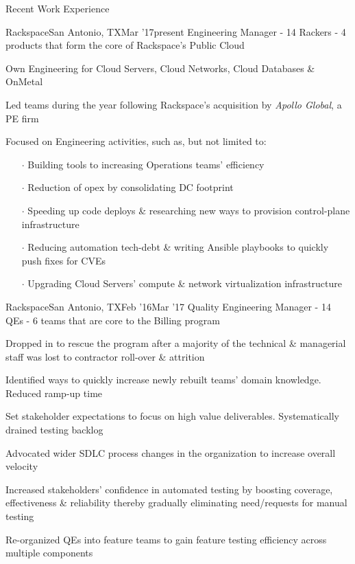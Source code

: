 \documentclass{resume} %
\begin{document}
\begin{rSection}{Recent Work Experience}

\begin{rSubsection}{Rackspace}{San Antonio, TX}{Mar '17}{present}
{Engineering Manager - 14 Rackers - 4 products that form the core of Rackspace's Public Cloud}
  
\item Own Engineering for Cloud Servers, Cloud Networks, Cloud Databases \& OnMetal
\item Led teams during the year following Rackspace's acquisition by {\em Apollo Global}, a PE firm
\item Focused on Engineering activities, such as, but not limited to:
  \vspace{-0.5em}
  \begin{itemize}  \itemsep0.5pt \parskip0pt
    \item[$\cdot$] Building tools to increasing Operations teams' efficiency
    \item[$\cdot$] Reduction of opex by consolidating DC footprint
    \item[$\cdot$] Speeding up code deploys \& researching new ways to provision control-plane infrastructure
    \item[$\cdot$] Reducing automation tech-debt \& writing Ansible playbooks to quickly push fixes for CVEs
    \item[$\cdot$] Upgrading Cloud Servers' compute \& network virtualization infrastructure
\end{itemize}
  
\end{rSubsection}
  
\begin{rSubsection}{Rackspace}{San Antonio, TX}{Feb '16}{Mar '17}
{Quality Engineering Manager - 14 QEs - 6 teams that are core to the Billing program}
  
\item Dropped in to rescue the program after a majority of the technical \& managerial staff was lost to contractor roll-over \& attrition
\item Identified ways to quickly increase newly rebuilt teams' domain knowledge. Reduced ramp-up time
\item Set stakeholder expectations to focus on high value deliverables. Systematically drained testing backlog
\item Advocated wider SDLC process changes in the organization to increase overall velocity
\item Increased stakeholders' confidence in automated testing by boosting coverage, effectiveness \& reliability thereby gradually eliminating need/requests for manual testing
\item Re-organized QEs into feature teams to gain feature testing efficiency across multiple components
  

\end{rSubsection}
\end{rSection}
\end{document}
